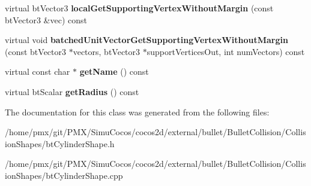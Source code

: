 \begin{DoxyCompactItemize}
virtual bt\+Vector3 {\bfseries local\+Get\+Supporting\+Vertex\+Without\+Margin} (const bt\+Vector3 \&vec) const
\item 
\mbox{\label{classbtCylinderShapeZ_a30985eed6aa791b40b69d351fb22f608}} 
virtual void {\bfseries batched\+Unit\+Vector\+Get\+Supporting\+Vertex\+Without\+Margin} (const bt\+Vector3 $\ast$vectors, bt\+Vector3 $\ast$support\+Vertices\+Out, int num\+Vectors) const
\item 
\mbox{\label{classbtCylinderShapeZ_a9096086ff2a57b746121d6a2c5e662e6}} 
virtual const char $\ast$ {\bfseries get\+Name} () const
\item 
\mbox{\label{classbtCylinderShapeZ_a1a41d57ef826063714b724032d5db362}} 
virtual bt\+Scalar {\bfseries get\+Radius} () const
\end{DoxyCompactItemize}


The documentation for this class was generated from the following files\+:\begin{DoxyCompactItemize}
\item 
/home/pmx/git/\+P\+M\+X/\+Simu\+Cocos/cocos2d/external/bullet/\+Bullet\+Collision/\+Collision\+Shapes/bt\+Cylinder\+Shape.\+h\item 
/home/pmx/git/\+P\+M\+X/\+Simu\+Cocos/cocos2d/external/bullet/\+Bullet\+Collision/\+Collision\+Shapes/bt\+Cylinder\+Shape.\+cpp\end{DoxyCompactItemize}
